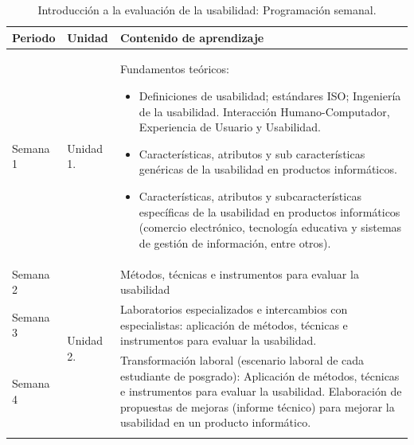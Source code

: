 \documentclass[spanish]{textolivre}
\begin{document}
\begin{table}[htbp]
\caption{Introducción a la evaluación de la usabilidad: Programación semanal.}
\label{tab1}
\centering
\begin{tabular}{p{}p{}p{}}
\toprule
Periodo  & Unidad  & Contenido de aprendizaje
\\
\midrule
\arrayrulecolor[gray]{.7}
Semana 1 & Unidad 1. & 
Fundamentos teóricos:
\begin{itemize}
    \item Definiciones de usabilidad; estándares ISO; Ingeniería de la usabilidad. Interacción Humano-Computador, Experiencia de Usuario y Usabilidad.
    \item Características, atributos y sub características genéricas de la usabilidad en productos informáticos.
    \item Características, atributos y subcaracterísticas específicas de la usabilidad en productos informáticos (comercio electrónico, tecnología educativa y sistemas de gestión de información, entre otros).
\end{itemize} \\
\midrule
Semana 2 & \multirow{3}{*}{Unidad 2.} & Métodos, técnicas e instrumentos para evaluar la usabilidad \\
Semana 3 & & Laboratorios especializados e intercambios con especialistas: aplicación de métodos, técnicas e instrumentos para evaluar la usabilidad. \\
Semana 4 & & Transformación laboral (escenario laboral de cada estudiante de posgrado): Aplicación de métodos, técnicas e instrumentos para evaluar la usabilidad. Elaboración de propuestas de mejoras (informe técnico) para mejorar la usabilidad en un producto informático. \\
\arrayrulecolor{black}
\bottomrule
\end{tabular}
\end{table}
\end{document}
